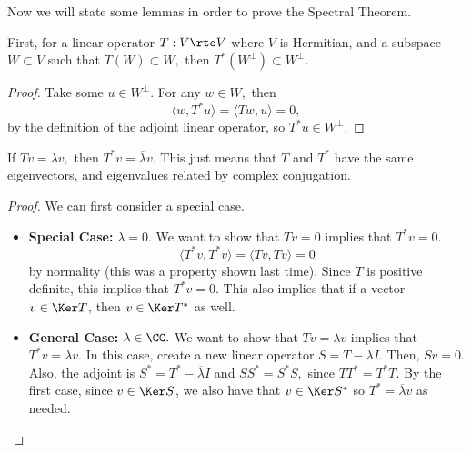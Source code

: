 Now we will state some lemmas in order to prove the Spectral Theorem.
\begin{lemma}[Lemma 1]
First, for a linear operator $T: V \rto V$ where $V$ is Hermitian, and a subspace $W \subset V$ such that $T(W) \subset W,$ then $T^*(W^\perp) \subset W^{\perp}.$
\end{lemma}
\begin{proof}
Take some $u \in W^\perp.$ For any $w \in W,$ then 
\[
\langle w, T^*u \rangle = \langle Tw, u\rangle = 0,
\]
by the definition of the adjoint linear operator, so $T^*u \in W^\perp.$
\end{proof}

\begin{lemma}[Lemma 2]
If $Tv = \lambda v,$ then $T^*v = \overline{\lambda}v.$
This just means that $T$ and $T^*$ have the same eigenvectors, and eigenvalues related by complex conjugation.
\end{lemma}
\begin{proof}
We can first consider a special case.
\begin{itemize}
    \item \textbf{Special Case:} $\lambda = 0.$ We want to show that $Tv=0$ implies that $T^*v = 0$.
    \[
    \langle T^*v, T^*v \rangle = \langle Tv, Tv \rangle = 0
    \]
    by normality (this was a property shown last time). 
    Since $T$ is positive definite, this implies that $T^*v = 0.$  
    This also implies that if a vector $v \in \Ker T$, then $v \in \Ker T^*$ as well.
    \item \textbf{General Case:} $\lambda \in \CC.$ We want to show that $Tv = \lambda v$ implies that $T^*v = \lambda v$. In this case, create a new linear operator $S = T - \lambda I.$ Then, $Sv = 0.$ Also, the adjoint is $S^* = T^* - \overline{\lambda}I$ and $SS^* = S^*S,$ since $TT^* = T^*T.$ %
    By the first case, since $v\in \Ker S$, we also have that $v \in \Ker S^*$ so $T^* = \overline{\lambda} v$ as needed.
\end{itemize}
\end{proof}

